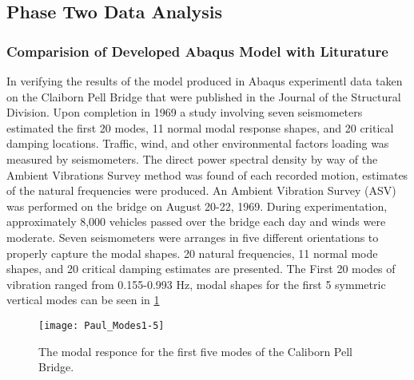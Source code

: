 \subsection{Phase Two Data Analysis}

\subsubsection{Comparision of Developed Abaqus Model with Liturature}


In verifying the results of the model produced in Abaqus experimentl data taken on the Claiborn Pell Bridge that were published in the Journal of the
Structural Division. Upon completion in 1969 a study involving seven seismometers estimated the first 20 modes, 11 normal modal response shapes, and 20
critical damping locations. Traffic, wind, and other environmental factors loading was measured by seismometers. The direct power spectral density by
way of the Ambient Vibrations Survey method was found of each recorded motion, estimates of the natural frequencies were produced. An Ambient Vibration
Survey (ASV) was performed on the bridge on August 20-22, 1969. During experimentation, approximately 8,000 vehicles passed over the bridge each day
and winds were moderate. Seven seismometers were arranges in five different orientations to properly capture the modal shapes. 20 natural
frequencies, 11 normal mode shapes, and 20 critical damping estimates are presented. The First 20 modes of vibration ranged from 0.155-0.993 Hz,
modal shapes for the first 5 symmetric vertical modes can be seen in \ref{fig:Paul_Modes1-5}\\

\begin{figure}

\centering

\texttt{[image: Paul\_Modes1-5]}

\caption{The modal responce for the first five modes of the Caliborn Pell Bridge.}

\label{fig:Paul_Modes1-5}

\end{figure}

